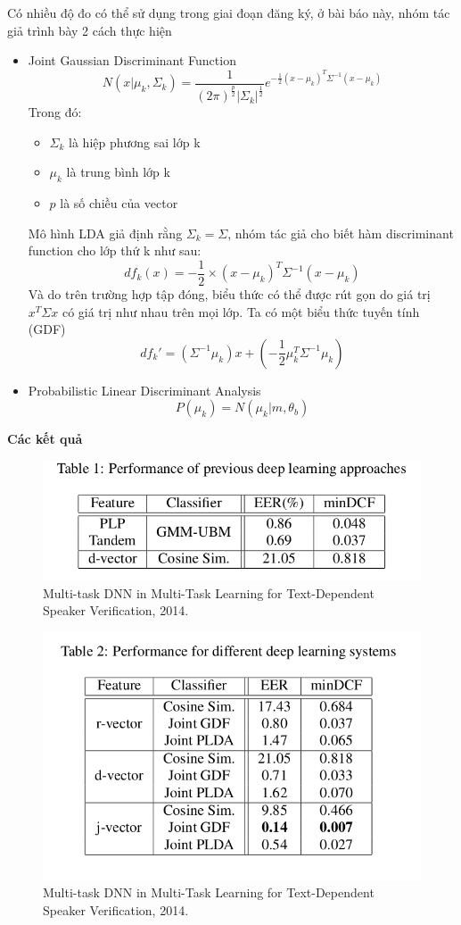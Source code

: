 \documentclass{article}
\begin{document}
	Có nhiều độ đo có thể sử dụng trong giai đoạn đăng ký, ở bài báo này, nhóm tác giả trình bày 2 cách thực hiện
	\begin{itemize}
		\item Joint Gaussian Discriminant Function
		$$\mathit{N}(x|\mu_k,\Sigma_k) = \frac{1}{(2\pi)^{\frac{p}{2}}|\Sigma_k|^{\frac{1}{2}}}e^{-\frac{1}{2}(x-\mu_k)^T\Sigma^{-1}(x-\mu_k)}$$
		Trong đó:
		\begin{itemize}
			\item $\Sigma_k$ là hiệp phương sai lớp k
			\item $\mu_k$ là trung bình lớp k
			\item $p$ là số chiều của vector
		\end{itemize}
		Mô hình LDA giả định rằng $\Sigma_k = \Sigma$, nhóm tác giả cho biết hàm discriminant function cho lớp thứ k như sau:
		$$df_k(x) = -\frac{1}{2} \times (x - \mu_k)^T\Sigma^{-1}(x-\mu_k)$$
		Và do trên trường hợp tập đóng, biểu thức có thể được rút gọn do giá trị $x^T\Sigma x$ có giá trị như nhau trên mọi lớp. Ta có một biểu thức tuyến tính (GDF)
		$$df_k' = (\Sigma^{-1}\mu_k)x + \left(-\frac{1}{2}\mu_k^T\Sigma^{-1}\mu_k\right)$$
		\item Probabilistic Linear Discriminant Analysis
		$$P(\mu_k) = N(\mu_k|m, \theta_b)$$
	\end{itemize}
	\textbf{Các kết quả}
	\begin{figure}[H]
		\centering
		\includegraphics[width=0.75\linewidth]{images/j-vectors-table-01.png}
		\caption{Multi-task DNN in Multi-Task Learning for Text-Dependent Speaker Verification, 2014.}
		\label{fig:writing-thesis}
	\end{figure}
	\begin{figure}[H]
		\centering
		\includegraphics[width=0.75\linewidth]{images/j-vectors-result-table-02.png}
		\caption{Multi-task DNN in Multi-Task Learning for Text-Dependent Speaker Verification, 2014.}
		\label{fig:writing-thesis}
	\end{figure}
\end{document}
